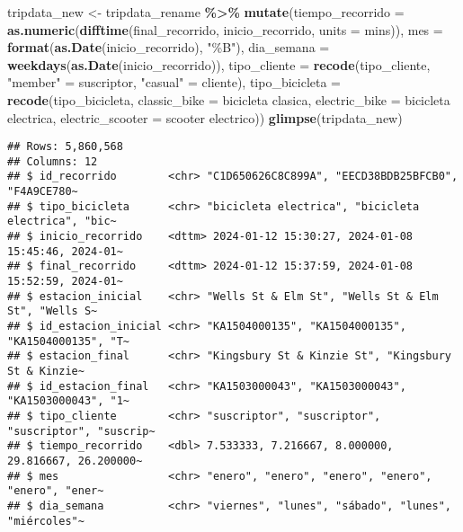 \documentclass[
]{article}
\newenvironment{Shaded}{\begin{snugshade}}{\end{snugshade}}
\newcommand{\AttributeTok}[1]{\textcolor[rgb]{0.13,0.29,0.53}{#1}}
\newcommand{\FunctionTok}[1]{\textcolor[rgb]{0.13,0.29,0.53}{\textbf{#1}}}
\newcommand{\NormalTok}[1]{#1}
\newcommand{\OtherTok}[1]{\textcolor[rgb]{0.56,0.35,0.01}{#1}}
\newcommand{\SpecialCharTok}[1]{\textcolor[rgb]{0.81,0.36,0.00}{\textbf{#1}}}
\newcommand{\StringTok}[1]{\textcolor[rgb]{0.31,0.60,0.02}{#1}}
\begin{document}
\begin{Shaded}
\begin{Highlighting}[]
\NormalTok{tripdata\_new }\OtherTok{\textless{}{-}}\NormalTok{ tripdata\_rename }\SpecialCharTok{\%\textgreater{}\%} 
  \FunctionTok{mutate}\NormalTok{(}\AttributeTok{tiempo\_recorrido =} \FunctionTok{as.numeric}\NormalTok{(}\FunctionTok{difftime}\NormalTok{(final\_recorrido, inicio\_recorrido, }\AttributeTok{units =} \StringTok{\textquotesingle{}mins\textquotesingle{}}\NormalTok{)),}
         \AttributeTok{mes =} \FunctionTok{format}\NormalTok{(}\FunctionTok{as.Date}\NormalTok{(inicio\_recorrido), }\StringTok{"\%B"}\NormalTok{),}
         \AttributeTok{dia\_semana =} \FunctionTok{weekdays}\NormalTok{(}\FunctionTok{as.Date}\NormalTok{(inicio\_recorrido)),}
         \AttributeTok{tipo\_cliente =} \FunctionTok{recode}\NormalTok{(tipo\_cliente,}
                               \StringTok{"member"} \OtherTok{=} \StringTok{\textquotesingle{}suscriptor\textquotesingle{}}\NormalTok{,}
                               \StringTok{"casual"} \OtherTok{=} \StringTok{\textquotesingle{}cliente\textquotesingle{}}\NormalTok{),}
         \AttributeTok{tipo\_bicicleta =} \FunctionTok{recode}\NormalTok{(tipo\_bicicleta,}
                                 \StringTok{\textquotesingle{}classic\_bike\textquotesingle{}} \OtherTok{=} \StringTok{\textquotesingle{}bicicleta clasica\textquotesingle{}}\NormalTok{,}
                                 \StringTok{\textquotesingle{}electric\_bike\textquotesingle{}} \OtherTok{=} \StringTok{\textquotesingle{}bicicleta electrica\textquotesingle{}}\NormalTok{,}
                                 \StringTok{\textquotesingle{}electric\_scooter\textquotesingle{}} \OtherTok{=} \StringTok{\textquotesingle{}scooter electrico\textquotesingle{}}\NormalTok{))}
\FunctionTok{glimpse}\NormalTok{(tripdata\_new)}
\end{Highlighting}
\end{Shaded}

\begin{verbatim}
## Rows: 5,860,568
## Columns: 12
## $ id_recorrido        <chr> "C1D650626C8C899A", "EECD38BDB25BFCB0", "F4A9CE780~
## $ tipo_bicicleta      <chr> "bicicleta electrica", "bicicleta electrica", "bic~
## $ inicio_recorrido    <dttm> 2024-01-12 15:30:27, 2024-01-08 15:45:46, 2024-01~
## $ final_recorrido     <dttm> 2024-01-12 15:37:59, 2024-01-08 15:52:59, 2024-01~
## $ estacion_inicial    <chr> "Wells St & Elm St", "Wells St & Elm St", "Wells S~
## $ id_estacion_inicial <chr> "KA1504000135", "KA1504000135", "KA1504000135", "T~
## $ estacion_final      <chr> "Kingsbury St & Kinzie St", "Kingsbury St & Kinzie~
## $ id_estacion_final   <chr> "KA1503000043", "KA1503000043", "KA1503000043", "1~
## $ tipo_cliente        <chr> "suscriptor", "suscriptor", "suscriptor", "suscrip~
## $ tiempo_recorrido    <dbl> 7.533333, 7.216667, 8.000000, 29.816667, 26.200000~
## $ mes                 <chr> "enero", "enero", "enero", "enero", "enero", "ener~
## $ dia_semana          <chr> "viernes", "lunes", "sábado", "lunes", "miércoles"~
\end{verbatim}
\end{document}
